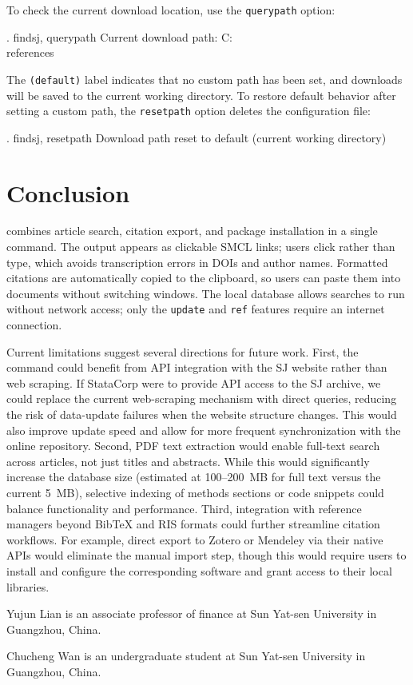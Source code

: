 To check the current download location, use the {\tt querypath} option:

\begin{stlog}
. findsj, querypath
Current download path: C:\\references
\end{stlog}

The {\tt (default)} label indicates that no custom path has been set, and downloads will be saved to the current working directory. To restore default behavior after setting a custom path, the {\tt resetpath} option deletes the configuration file:

\begin{stlog}
. findsj, resetpath
Download path reset to default (current working directory)
\end{stlog}


\section{Conclusion}
\label{sec:conclusion}

 combines article search, citation export, and package installation in a single command. The output appears as clickable SMCL links; users click rather than type, which avoids transcription errors in DOIs and author names. Formatted citations are automatically copied to the clipboard, so users can paste them into documents without switching windows. The local database allows searches to run without network access; only the \texttt{update} and \texttt{ref} features require an internet connection.

Current limitations suggest several directions for future work. First, the command could benefit from API integration with the SJ website rather than web scraping. If StataCorp were to provide API access to the SJ archive, we could replace the current web-scraping mechanism with direct queries, reducing the risk of data-update failures when the website structure changes. This would also improve update speed and allow for more frequent synchronization with the online repository. Second, PDF text extraction would enable full-text search across articles, not just titles and abstracts. While this would significantly increase the database size (estimated at 100--200~MB for full text versus the current 5~MB), selective indexing of methods sections or code snippets could balance functionality and performance. Third, integration with reference managers beyond BibTeX and RIS formats could further streamline citation workflows. For example, direct export to Zotero or Mendeley via their native APIs would eliminate the manual import step, though this would require users to install and configure the corresponding software and grant  access to their local libraries.





\begin{aboutauthors}
Yujun Lian is an associate professor of finance at Sun Yat-sen University in Guangzhou, China.

Chucheng Wan is an undergraduate student at Sun Yat-sen University in Guangzhou, China.
\end{aboutauthors}

\endinput